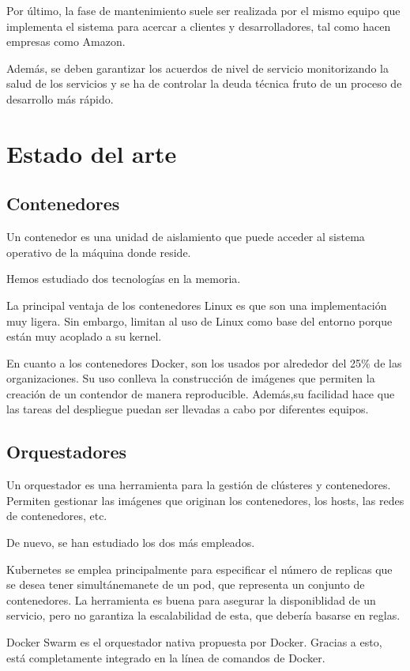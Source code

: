 \documentclass[11pt,a4paper]{article}
\begin{document}
Por último, la fase de mantenimiento suele ser realizada por el mismo equipo que implementa el sistema para acercar a clientes y desarrolladores, tal como hacen empresas como Amazon.

Además, se deben garantizar los acuerdos de nivel de servicio monitorizando la salud de los servicios
y se ha de controlar la deuda técnica fruto de un proceso de desarrollo más rápido.

\section{Estado del arte}


\subsection{Contenedores}
Un contenedor es una unidad de aislamiento que puede acceder al sistema operativo de la máquina donde reside.

Hemos estudiado dos tecnologías en la memoria.

La principal ventaja de los contenedores Linux es que son una implementación muy ligera. Sin embargo, limitan al uso de Linux como base del entorno porque están muy acoplado a su kernel. 

En cuanto a los contenedores Docker, son los usados por alrededor del 25\% de las organizaciones. Su uso conlleva la construcción de imágenes que permiten la creación de un contendor de manera reproducible. Además,su facilidad hace que las tareas del despliegue puedan ser llevadas a cabo por diferentes equipos.

\subsection{Orquestadores}

Un orquestador  es una herramienta para la gestión de clústeres y contenedores. Permiten gestionar las imágenes que originan los contenedores, los hosts, las redes de contenedores, etc.

De nuevo, se han estudiado los dos más empleados.

Kubernetes se emplea principalmente para especificar el número de replicas que se desea tener simultánemanete de un pod, que representa un conjunto de contenedores. La herramienta es buena para asegurar la disponiblidad de un servicio, pero no garantiza la escalabilidad de esta, que debería basarse en reglas.

Docker Swarm es el orquestador nativa propuesta por Docker. Gracias a esto, está completamente integrado en la línea de comandos de Docker.
\end{document}
